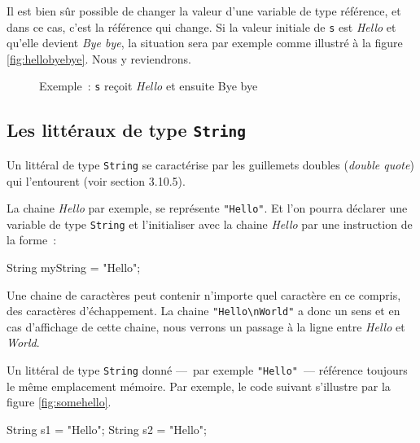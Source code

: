 Il est bien sûr possible de changer la valeur d'une variable de type référence,
et dans ce cas, c'est la référence qui change. Si la valeur initiale de
\texttt{s} est \textit{Hello} et qu'elle devient \textit{Bye bye}, la situation
sera par exemple comme illustré à la figure \vref{fig:hellobyebye}. Nous
y reviendrons. 

\begin{figure}[h]
	\centering
	\caption{Exemple : \texttt{s} reçoit \textit{Hello} et ensuite {Bye bye}}
	\label{fig:hellobyebye}
\end{figure}



\subsection{Les littéraux de type \texttt{String}}

Un littéral de type \texttt{String} se caractérise par les guillemets doubles
(\textit{double quote}) qui l'entourent (voir \cite{jls9} section 3.10.5). 

La chaine \textit{Hello} par exemple, se représente \texttt{"Hello"}. Et l'on
pourra déclarer une variable de type \texttt{String} et l'initialiser avec la
chaine \textit{Hello} par une instruction de la forme~:

\begin{java}
	String myString = "Hello";
\end{java}

Une chaine de caractères peut contenir n'importe quel caractère en ce compris,
des caractères d'échappement. La chaine \texttt{"Hello\textbackslash nWorld"}
a donc un sens et en cas d'affichage de cette chaine, nous verrons un passage
à la ligne entre \textit{Hello} et \textit{World}.  

Un littéral de type \texttt{String} donné —~par exemple
\texttt{"Hello"}~— référence toujours le même emplacement mémoire. Par exemple,
le code suivant s'illustre par la figure \vref{fig:somehello}. 

\begin{java}
	String s1 = "Hello";
	String s2 = "Hello";
\end{java}

